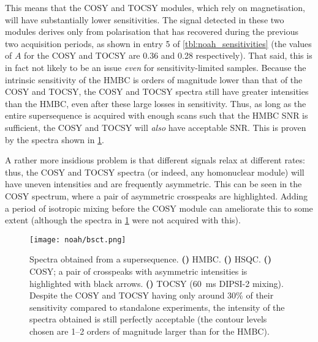 This means that the COSY and TOCSY modules, which rely on  magnetisation, will have substantially lower sensitivities.
The signal detected in these two modules derives only from polarisation that has recovered during the previous two acquisition periods, as shown in entry 5 of \cref{tbl:noah_sensitivities} (the values of $A$ for the COSY and TOCSY are 0.36 and 0.28 respectively).
That said, this is in fact not likely to be an issue \textit{even} for sensitivity-limited samples.
Because the intrinsic sensitivity of the HMBC is orders of magnitude lower than that of the COSY and TOCSY, the COSY and TOCSY spectra still have greater intensities than the HMBC, even after these large losses in sensitivity.
Thus, as long as the entire supersequence is acquired with enough scans such that the HMBC SNR is sufficient, the COSY and TOCSY will \textit{also} have acceptable SNR.
This is proven by the spectra shown in \cref{fig:bsct}.

A rather more insidious problem is that different signals relax at different rates: thus, the COSY and TOCSY spectra (or indeed, any homonuclear module) will have uneven intensities and are frequently asymmetric.
This can be seen in the COSY spectrum, where a pair of asymmetric crosspeaks are highlighted.
Adding a period of isotropic mixing before the COSY module\autocite{Kupce2018CC} can ameliorate this to some extent (although the spectra in \cref{fig:bsct} were not acquired with this).

\begin{figure}[!ht]
    \centering
    \texttt{[image: noah/bsct.png]}%
    {\label{fig:bsct_b}}%
    {\label{fig:bsct_s}}%
    {\label{fig:bsct_c}}%
    {\label{fig:bsct_t}}%
    \caption[Spectra obtained from a  supersequence.]{
        Spectra obtained from a  supersequence. 
        \textbf{()} HMBC.
        \textbf{()} HSQC.
        \textbf{()} COSY; a pair of crosspeaks with asymmetric intensities is highlighted with black arrows.
        \textbf{()} TOCSY (\qty{60}{\ms} DIPSI-2 mixing).
        Despite the COSY and TOCSY having only around 30\% of their sensitivity compared to standalone experiments, the intensity of the spectra obtained is still perfectly acceptable (the contour levels chosen are 1--2 orders of magnitude larger than for the HMBC).
    }
    \label{fig:bsct}
\end{figure}


